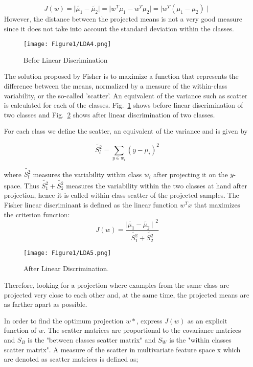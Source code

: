 \begin{equation}
J\left(w\right)=\mid\tilde{\mu_1}-\tilde{\mu_2}\mid=\mid w^T\mu_1- w^T\mu_2\mid=\mid w^T\left(\mu_1-\mu_2\right)\mid
\end{equation}
However, the distance between the projected means is not a very good measure since it does not take into account the standard deviation within the classes.

\begin{figure}
\centering
\texttt{[image: Figure1/LDA4.png]}
\caption{Befor Linear Discrimination}
\label{lad4}
\end{figure}


The solution proposed by Fisher is to maximize a function that represents the difference between the means, normalized by a measure of the within-class variability, or the so-called 'scatter'. An equivalent of the variance such as scatter is calculated for each of the classes. Fig.~\ref{lad4} shows before linear discrimination of two classes and Fig.~\ref{lad5} shows after linear discrimination of two classes.
         
For each class we define the scatter, an equivalent of the variance and is given by

\begin{equation}
\tilde{S_l^2}= \sum_{y\in w_i}\left( y-\mu_i\right)^2
\end{equation}

where $\tilde{S_l^2}$ measures the variability within class $w_i$ after projecting it on the $y$-space.
Thus  $\tilde{S_1^2}+\tilde{S_2^2}$ measures the variability within the two classes at hand after projection, hence it is called within-class scatter of the projected samples. 
The Fisher linear discriminant is defined as the linear function $w^T x$ that maximizes the criterion function:
\begin{equation}
J\left(w\right)=\frac{{\mid\tilde{\mu_1}-\tilde{\mu_2}\mid}^2}{\tilde{S_1^2}+\tilde{S_2^2}}
\end{equation}
\begin{figure}
\centering
\texttt{[image: Figure1/LDA5.png]}
\caption{After Linear Discrimination.}
\label{lad5}
\end{figure}
Therefore, looking for a projection where examples from the same class are projected very close to each other and, at the same time, the projected means are as farther apart as possible.

In order to find the optimum projection $w*$, express $J(w)$ as an explicit function of $w$. The scatter matrices are proportional to the covariance matrices and $S_B$ is the "between classes scatter matrix" and $S_W$ is the "within classes scatter matrix". A measure of the scatter in multivariate feature space x which are denoted as scatter matrices is defined as;                      

